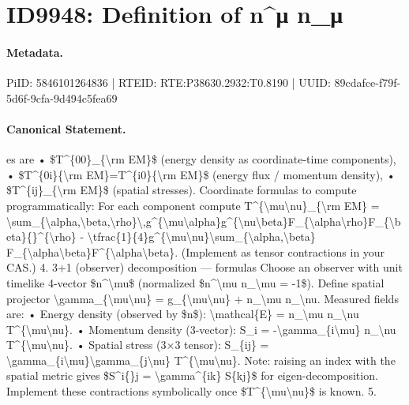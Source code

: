 \section*{ID9948: Definition of n\textasciicircum{}μ n\_μ}
\paragraph{Metadata.}
PiID: 5846101264836 | RTEID: RTE:P38630.2932:T0.8190 | UUID: 89cdafce-f79f-5d6f-9cfa-9d494c5fea69

\paragraph{Canonical Statement.}
es are • \$T\textasciicircum{}\{00\}\_\{\textbackslash{}rm EM\}\$ (energy density as coordinate-time components), • \$T\textasciicircum{}\{0i\}\{\textbackslash{}rm EM\}=T\textasciicircum{}\{i0\}\{\textbackslash{}rm EM\}\$ (energy flux / momentum density), • \$T\textasciicircum{}\{ij\}\_\{\textbackslash{}rm EM\}\$ (spatial stresses). Coordinate formulas to compute programmatically: For each component compute T\textasciicircum{}\{\textbackslash{}mu\textbackslash{}nu\}\_\{\textbackslash{}rm EM\} = \textbackslash{}sum\_\{\textbackslash{}alpha,\textbackslash{}beta,\textbackslash{}rho\}\textbackslash{},g\textasciicircum{}\{\textbackslash{}mu\textbackslash{}alpha\}g\textasciicircum{}\{\textbackslash{}nu\textbackslash{}beta\}F\_\{\textbackslash{}alpha\textbackslash{}rho\}F\_\{\textbackslash{}beta\}\{\}\textasciicircum{}\{\textbackslash{}rho\} - \textbackslash{}tfrac\{1\}\{4\}g\textasciicircum{}\{\textbackslash{}mu\textbackslash{}nu\}\textbackslash{}sum\_\{\textbackslash{}alpha,\textbackslash{}beta\} F\_\{\textbackslash{}alpha\textbackslash{}beta\}F\textasciicircum{}\{\textbackslash{}alpha\textbackslash{}beta\}. (Implement as tensor contractions in your CAS.) 4. 3+1 (observer) decomposition — formulas Choose an observer with unit timelike 4-vector \$n\textasciicircum{}\textbackslash{}mu\$ (normalized \$n\textasciicircum{}\textbackslash{}mu n\_\textbackslash{}mu = -1\$). Define spatial projector \textbackslash{}gamma\_\{\textbackslash{}mu\textbackslash{}nu\} = g\_\{\textbackslash{}mu\textbackslash{}nu\} + n\_\textbackslash{}mu n\_\textbackslash{}nu. Measured fields are: • Energy density (observed by \$n\$): \textbackslash{}mathcal\{E\} = n\_\textbackslash{}mu n\_\textbackslash{}nu T\textasciicircum{}\{\textbackslash{}mu\textbackslash{}nu\}. • Momentum density (3-vector): S\_i = -\textbackslash{}gamma\_\{i\textbackslash{}mu\} n\_\textbackslash{}nu T\textasciicircum{}\{\textbackslash{}mu\textbackslash{}nu\}. • Spatial stress (3×3 tensor): S\_\{ij\} = \textbackslash{}gamma\_\{i\textbackslash{}mu\}\textbackslash{}gamma\_\{j\textbackslash{}nu\} T\textasciicircum{}\{\textbackslash{}mu\textbackslash{}nu\}. Note: raising an index with the spatial metric gives \$S\textasciicircum{}i\{\}j = \textbackslash{}gamma\textasciicircum{}\{ik\} S\{kj\}\$ for eigen-decomposition. Implement these contractions symbolically once \$T\textasciicircum{}\{\textbackslash{}mu\textbackslash{}nu\}\$ is known. 5.

